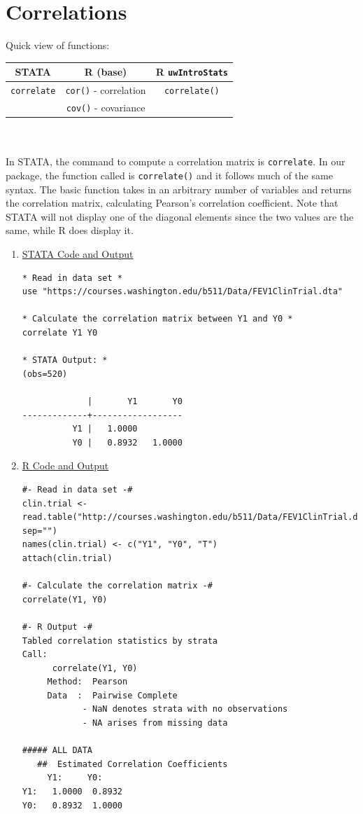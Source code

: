 \documentclass[11pt,letterpaper,fleqn]{report}
\begin{document}
\chapter{Correlations}
Quick view of functions:\\
\begin{tabular}{ccc}
STATA & R (base) & R \texttt{uwIntroStats}\\
\hline
\texttt{correlate} & \texttt{cor()} - correlation & \texttt{correlate()}\\
 & \texttt{cov()} - covariance & 
\end{tabular}\\
\\
In STATA, the command to compute a correlation matrix is \texttt{correlate}. In our package, the function called is \texttt{correlate()} and it follows much of the same syntax. The basic function takes in an arbitrary number of variables and returns the correlation matrix, calculating Pearson's correlation coefficient. Note that STATA will not display one of the diagonal elements since the two values are the same, while R does display it. 
\begin{enumerate}[]
\item \underline{STATA Code and Output}
{\scriptsize
\begin{verbatim}
* Read in data set *
use "https://courses.washington.edu/b511/Data/FEV1ClinTrial.dta"

* Calculate the correlation matrix between Y1 and Y0 *
correlate Y1 Y0

* STATA Output: *
(obs=520)

             |       Y1       Y0
-------------+------------------
          Y1 |   1.0000
          Y0 |   0.8932   1.0000

\end{verbatim}}
\item \underline{R Code and Output}
{\scriptsize
\begin{verbatim}
#- Read in data set -#
clin.trial <- read.table("http://courses.washington.edu/b511/Data/FEV1ClinTrial.dat", sep="")
names(clin.trial) <- c("Y1", "Y0", "T")
attach(clin.trial)

#- Calculate the correlation matrix -#
correlate(Y1, Y0)

#- R Output -# 
Tabled correlation statistics by strata
Call:
      correlate(Y1, Y0) 
     Method:  Pearson 
     Data  :  Pairwise Complete 
            - NaN denotes strata with no observations
            - NA arises from missing data

##### ALL DATA
   ##  Estimated Correlation Coefficients 
     Y1:     Y0:    
Y1:   1.0000  0.8932
Y0:   0.8932  1.0000
\end{verbatim}}
\end{enumerate}
\end{document}
